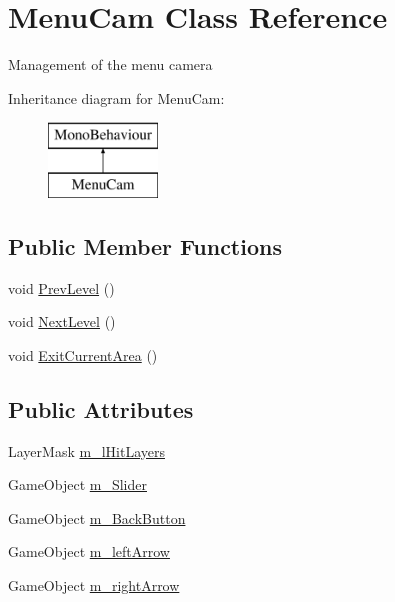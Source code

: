 \hypertarget{class_menu_cam}{}\section{Menu\+Cam Class Reference}
\label{class_menu_cam}


Management of the menu camera  


Inheritance diagram for Menu\+Cam\+:\begin{figure}[H]
\begin{center}
\leavevmode
\includegraphics[height=2.000000cm]{class_menu_cam}
\end{center}
\end{figure}
\subsection*{Public Member Functions}
\begin{DoxyCompactItemize}
\item 
void \mbox{\hyperlink{class_menu_cam_aa0e4bff687d9e8486a5c212dec6fcf3f}{Prev\+Level}} ()
\item 
void \mbox{\hyperlink{class_menu_cam_a3a0722e7dad7bda1a88162fc7d4f9b6d}{Next\+Level}} ()
\item 
void \mbox{\hyperlink{class_menu_cam_a95f4d4c1cace6c102e38e60d937abd1e}{Exit\+Current\+Area}} ()
\end{DoxyCompactItemize}
\subsection*{Public Attributes}
\begin{DoxyCompactItemize}
\item 
Layer\+Mask \mbox{\hyperlink{class_menu_cam_a66c081dba7c09e19c622518c5d249ae9}{m\+\_\+l\+Hit\+Layers}}
\item 
Game\+Object \mbox{\hyperlink{class_menu_cam_a0128de9f975a3f41b97bf54551dc9c3d}{m\+\_\+\+Slider}}
\item 
Game\+Object \mbox{\hyperlink{class_menu_cam_a2fe7d2a774eafa062722685ba5f10862}{m\+\_\+\+Back\+Button}}
\item 
Game\+Object \mbox{\hyperlink{class_menu_cam_a427bf2012fef3d7a249b65be3bbcb646}{m\+\_\+left\+Arrow}}
\item 
Game\+Object \mbox{\hyperlink{class_menu_cam_afa17cc96b5e31556c7de5eb9fff6aa81}{m\+\_\+right\+Arrow}}
\end{DoxyCompactItemize}
